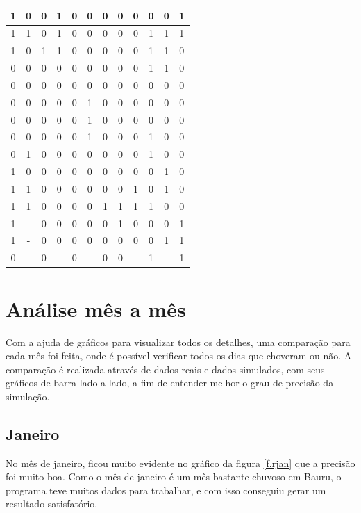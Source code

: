 \begin{table}[H]
\begin{tabular}{|c|c|c|c|c|c|c|c|c|c|c|c|}
1 & 0 & 0 & 1 & 0 & 0 & 0 & 0 & 0 & 0 & 0 & 1 \\ \hline
1 & 1 & 0 & 1 & 0 & 0 & 0 & 0 & 0 & 1 & 1 & 1 \\ \hline
1 & 0 & 1 & 1 & 0 & 0 & 0 & 0 & 0 & 1 & 1 & 0 \\ \hline
0 & 0 & 0 & 0 & 0 & 0 & 0 & 0 & 0 & 1 & 1 & 0 \\ \hline
0 & 0 & 0 & 0 & 0 & 0 & 0 & 0 & 0 & 0 & 0 & 0 \\ \hline
0 & 0 & 0 & 0 & 0 & 1 & 0 & 0 & 0 & 0 & 0 & 0 \\ \hline
0 & 0 & 0 & 0 & 0 & 1 & 0 & 0 & 0 & 0 & 0 & 0 \\ \hline
0 & 0 & 0 & 0 & 0 & 1 & 0 & 0 & 0 & 1 & 0 & 0 \\ \hline
0 & 1 & 0 & 0 & 0 & 0 & 0 & 0 & 0 & 1 & 0 & 0 \\ \hline
1 & 0 & 0 & 0 & 0 & 0 & 0 & 0 & 0 & 0 & 1 & 0 \\ \hline
1 & 1 & 0 & 0 & 0 & 0 & 0 & 0 & 1 & 0 & 1 & 0 \\ \hline
1 & 1 & 0 & 0 & 0 & 0 & 1 & 1 & 1 & 1 & 0 & 0 \\ \hline
1 & - & 0 & 0 & 0 & 0 & 0 & 1 & 0 & 0 & 0 & 1 \\ \hline
1 & - & 0 & 0 & 0 & 0 & 0 & 0 & 0 & 0 & 1 & 1 \\ \hline
0 & - & 0 & - & 0 & - & 0 & 0 & - & 1 & - & 1 \\ \hline
\end{tabular}
\vspace*{15px}
\end{table}

\section{Análise mês a mês}
Com a ajuda de gráficos para visualizar todos os detalhes, uma comparação para cada mês foi feita, onde é possível verificar todos os dias que choveram ou não. A comparação é realizada através de dados reais e dados simulados, com seus gráficos de barra lado a lado, a fim de entender melhor o grau de precisão da simulação.
\subsection{Janeiro}
No mês de janeiro, ficou muito evidente no gráfico da figura \ref{f.rjan} que a precisão foi muito boa. Como o mês de janeiro é um mês bastante chuvoso em Bauru, o programa teve muitos dados para trabalhar, e com isso conseguiu gerar um resultado satisfatório.

